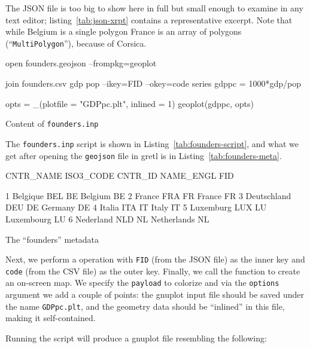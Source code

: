 \documentclass{article}
\begin{document}
The JSON file is too big to show here in full but small enough to
examine in any text editor; listing~\ref{tab:json-xrpt} contains a
representative excerpt. Note that while Belgium is a single polygon
France is an array of polygons (``\texttt{MultiPolygon}''), because of
Corsica.

\begin{script}[htbp]
\begin{scode}
open founders.geojson --frompkg=geoplot

join founders.csv gdp pop --ikey=FID --okey=code
series gdppc = 1000*gdp/pop

opts = _(plotfile = "GDPpc.plt", inlined = 1)
geoplot(gdppc, opts)
\end{scode}
\caption{Content of \texttt{founders.inp}}
\label{tab:founders-script}
\end{script}

The \texttt{founders.inp} script is shown in
Listing~\ref{tab:founders-script}, and what we get after opening the
\texttt{geojson} file in gretl is in Listing~\ref{tab:founders-meta}.

\begin{script}[htbp]
\begin{scode}
     CNTR_NAME    ISO3_CODE      CNTR_ID    NAME_ENGL          FID

1     Belgique          BEL           BE      Belgium           BE
2       France          FRA           FR       France           FR
3  Deutschland          DEU           DE      Germany           DE
4       Italia          ITA           IT        Italy           IT
5    Luxemburg          LUX           LU   Luxembourg           LU
6    Nederland          NLD           NL  Netherlands           NL
\end{scode}
\caption{The ``founders'' metadata}
\label{tab:founders-meta}
\end{script}

Next, we perform a  operation with \texttt{FID} (from the
JSON file) as the inner key and \texttt{code} (from the CSV file) as
the outer key. Finally, we call the  function to create
an on-screen map. We specify the \texttt{payload} to colorize and via
the \texttt{options} argument we add a couple of points: the
\textsf{gnuplot} input file should be saved under the name
\texttt{GDPpc.plt}, and the geometry data should be ``inlined'' in
this file, making it self-contained.

Running the script will produce a \textsf{gnuplot} file resembling the
following:
\end{document}

